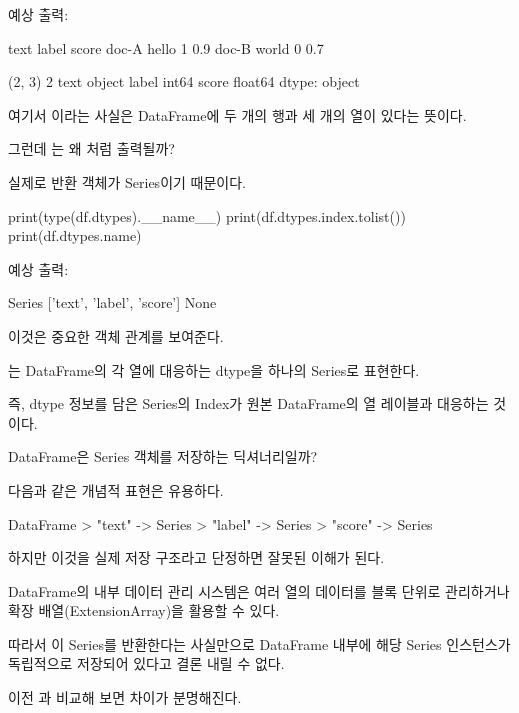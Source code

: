 예상 출력:

\begin{dhkzsh}
        text  label  score
doc-A  hello      1    0.9
doc-B  world      0    0.7

(2, 3)
2
text      object
label      int64
score    float64
dtype: object
\end{dhkzsh}

여기서 이라는 사실은 DataFrame에 두 개의 행과 세 개의 열이 있다는 뜻이다.

그런데 는 왜 처럼 출력될까?

실제로 반환 객체가 Series이기 때문이다.

\begin{dhkcode}
print(type(df.dtypes).__name__)
print(df.dtypes.index.tolist())
print(df.dtypes.name)
\end{dhkcode}

예상 출력:

\begin{dhkzsh}
Series
['text', 'label', 'score']
None
\end{dhkzsh}

이것은 중요한 객체 관계를 보여준다.

는 DataFrame의 각 열에 대응하는 dtype을 하나의 Series로 표현한다.

즉, dtype 정보를 담은 Series의 Index가 원본 DataFrame의 열 레이블과 대응하는 것이다.

\begin{dhknote}
\begin{dhksmry}[centered]
DataFrame은 Series 객체를 저장하는 딕셔너리일까?
\end{dhksmry}
\end{dhknote}

다음과 같은 개념적 표현은 유용하다.

\begin{dhkdir}[in=6]
DataFrame
> "text" -> Series
> "label" -> Series
> "score" -> Series
\end{dhkdir}

하지만 이것을 실제 저장 구조라고 단정하면 잘못된 이해가 된다.

DataFrame의 내부 데이터 관리 시스템은 여러 열의 데이터를 블록 단위로 관리하거나 확장 배열(ExtensionArray)을 활용할 수 있다.

따라서 이 Series를 반환한다는 사실만으로 DataFrame 내부에 해당 Series 인스턴스가 독립적으로 저장되어 있다고 결론 내릴 수 없다.

이전 과 비교해 보면 차이가 분명해진다.


